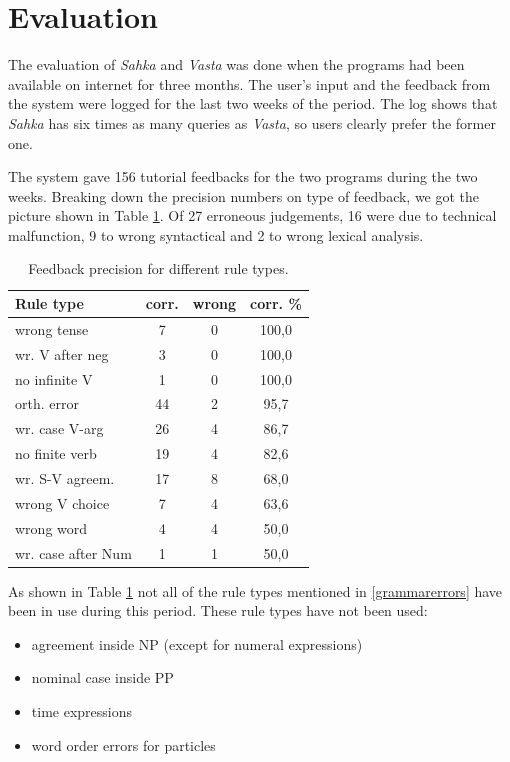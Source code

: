 \documentclass[11pt]{article}
\begin{document}
\section{Evaluation}
The evaluation of \textit{Sahka} and \textit{Vasta} was done when the programs had been available on internet for three months. The user's input and the feedback from the system were logged for the last two weeks of the period. The log shows that \textit{Sahka} has six times as many queries as \textit{Vasta}, so users clearly prefer the former one.

The system gave 156 tutorial feedbacks for the two programs during the two weeks. Breaking down the precision numbers on type of feedback, we got the picture shown in Table \ref{ruletypes}. Of 27 erroneous judgements, 16 were due to technical malfunction, 9 to wrong syntactical and 2 to wrong lexical analysis. \\

\begin{table}[htbp]
\begin{tabular}{|l|c|c|c|}
\hline 
\textbf{Rule type}  & \textbf{corr.} & \textbf{wrong}   & \textbf{corr. \% }  \\
\hline 
wrong tense         & 7     & 0     & 100,0     \\ 
wr. V after neg   & 3     & 0     & 100,0     \\ 
no infinite V       & 1     & 0     & 100,0     \\ 
\hline 
orth. error         & 44    & 2     & 95,7      \\
wr. case V-arg  & 26    & 4     & 86,7      \\
no finite verb        & 19    & 4     &  82,6 \\
\hline 
wr. S-V agreem.   & 17    & 8     & 68,0 \\
wrong V choice        & 7     & 4     & 63,6 \\
\hline 
wrong word            & 4     & 4     & 50,0 \\
wr. case after Num  & 1     & 1     & 50,0 \\
\hline
\end{tabular}
\caption{Feedback precision for different rule types.}
\label{ruletypes}
\end{table}

As shown in Table \ref{ruletypes} not all of the rule types mentioned in \ref{grammarerrors} have been in use during this period. These rule types have not been used:

\begin{itemize}
\setlength{\itemsep}{-0.7cm}
\item agreement inside NP (except for numeral expressions) \\
\item nominal case inside PP  \\
\item time expressions \\
\item word order errors for particles\\
\end{itemize}
\end{document}

